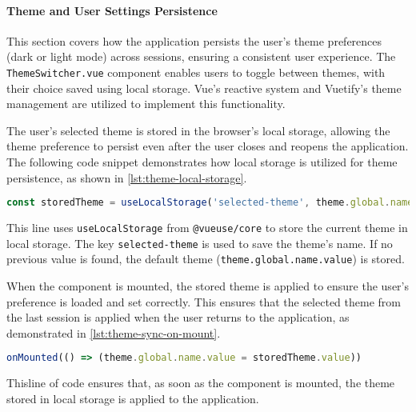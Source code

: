 \paragraph{Theme and User Settings Persistence}%

This section covers how the application persists the user's theme preferences (dark or light mode) across sessions,
ensuring a consistent user experience. The \texttt{ThemeSwitcher.vue}
component enables users to toggle between themes, with their choice saved using local storage. Vue’s reactive system and
Vuetify’s theme management are utilized to implement this functionality.

The user's selected theme is stored in the browser’s local storage, allowing the theme preference to persist even after
the user closes and reopens the application. The following code snippet demonstrates how local storage is utilized for
theme persistence, as shown in \ref{lst:theme-local-storage}.

\begin{lstlisting}[language=JavaScript, caption={Using Local Storage for Theme Persistence (\texttt{ThemeSwitcher.vue})},
  firstnumber=7,label={lst:theme-local-storage}]
const storedTheme = useLocalStorage('selected-theme', theme.global.name.value)
\end{lstlisting}

This line uses \texttt{useLocalStorage} from \texttt{@vueuse/core} to store the current theme
in local storage. The key \texttt{selected-theme} is used to save the theme's name. If no previous value
is found, the default theme (\texttt{theme.global.name.value}) is stored.

When the component is mounted, the stored theme is applied to ensure the user’s preference
is loaded and set correctly. This ensures that the selected theme from the last session is applied when the user
returns to the application, as demonstrated in \ref{lst:theme-sync-on-mount}.

\begin{lstlisting}[language=JavaScript, caption={Syncing Theme on Mount (\texttt{ThemeSwitcher.vue})},
  firstnumber=9,label={lst:theme-sync-on-mount}]
onMounted(() => (theme.global.name.value = storedTheme.value))
\end{lstlisting}

Thisline of code ensures that, as soon as the component is mounted, the theme stored in local storage
is applied to the application.


